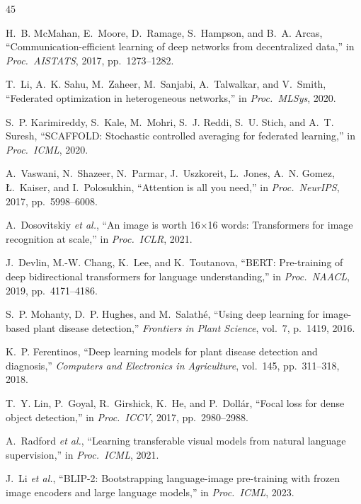 \documentclass[conference]{IEEEtran}
\begin{document}
\begin{thebibliography}{45}

H.~B. McMahan, E.~Moore, D.~Ramage, S.~Hampson, and B.~A. Arcas,
``Communication-efficient learning of deep networks from decentralized data,''
in \emph{Proc.\ AISTATS}, 2017, pp.\ 1273--1282.

T.~Li, A.~K. Sahu, M.~Zaheer, M.~Sanjabi, A.~Talwalkar, and V.~Smith,
``Federated optimization in heterogeneous networks,''
in \emph{Proc.\ MLSys}, 2020.

S.~P. Karimireddy, S.~Kale, M.~Mohri, S.~J. Reddi, S.~U. Stich, and A.~T. Suresh,
``SCAFFOLD: Stochastic controlled averaging for federated learning,''
in \emph{Proc.\ ICML}, 2020.

A.~Vaswani, N.~Shazeer, N.~Parmar, J.~Uszkoreit, L.~Jones, A.~N. Gomez, \L.~Kaiser,
and I.~Polosukhin,
``Attention is all you need,''
in \emph{Proc.\ NeurIPS}, 2017, pp.\ 5998--6008.

A.~Dosovitskiy \emph{et al.},
``An image is worth 16$\times$16 words: Transformers for image recognition at scale,''
in \emph{Proc.\ ICLR}, 2021.

J.~Devlin, M.-W. Chang, K.~Lee, and K.~Toutanova,
``BERT: Pre-training of deep bidirectional transformers for language understanding,''
in \emph{Proc.\ NAACL}, 2019, pp.\ 4171--4186.

S.~P. Mohanty, D.~P. Hughes, and M.~Salath\'{e},
``Using deep learning for image-based plant disease detection,''
\emph{Frontiers in Plant Science}, vol.~7, p.~1419, 2016.

K.~P. Ferentinos,
``Deep learning models for plant disease detection and diagnosis,''
\emph{Computers and Electronics in Agriculture}, vol.~145, pp.\ 311--318, 2018.

T.~Y. Lin, P.~Goyal, R.~Girshick, K.~He, and P.~Doll\'{a}r,
``Focal loss for dense object detection,''
in \emph{Proc.\ ICCV}, 2017, pp.\ 2980--2988.

A.~Radford \emph{et al.},
``Learning transferable visual models from natural language supervision,''
in \emph{Proc.\ ICML}, 2021.

J.~Li \emph{et al.},
``BLIP-2: Bootstrapping language-image pre-training with frozen image encoders
and large language models,''
in \emph{Proc.\ ICML}, 2023.


\end{thebibliography}
\end{document}
